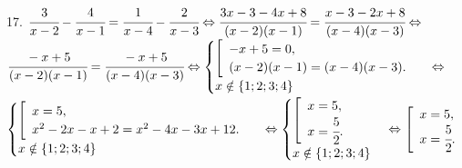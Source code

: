 17. $\cfrac{3}{x-2}-\cfrac{4}{x-1}=\cfrac{1}{x-4}-\cfrac{2}{x-3}\Leftrightarrow \cfrac{3x-3-4x+8}{(x-2)(x-1)}=\cfrac{x-3-2x+8}{(x-4)(x-3)}\Leftrightarrow$\\$
\cfrac{-x+5}{(x-2)(x-1)}=\cfrac{-x+5}{(x-4)(x-3)}\Leftrightarrow \begin{cases} \left[\begin{array}{l}-x+5=0,\\
(x-2)(x-1)=(x-4)(x-3).\end{array}\right.\\ x\notin\{1;2;3;4\}\end{cases}\Leftrightarrow$\\$\begin{cases}\left[\begin{array}{l}x=5,\\
x^2-2x-x+2=x^2-4x-3x+12.\end{array}\right.\\ x\notin\{1;2;3;4\}\end{cases}\Leftrightarrow \begin{cases} \left[\begin{array}{l}x=5,\\
x=\cfrac{5}{2}.\end{array}\right.\\ x\notin\{1;2;3;4\}\end{cases}\Leftrightarrow\left[\begin{array}{l}x=5,\\
x=\cfrac{5}{2}.\end{array}\right.$\\
